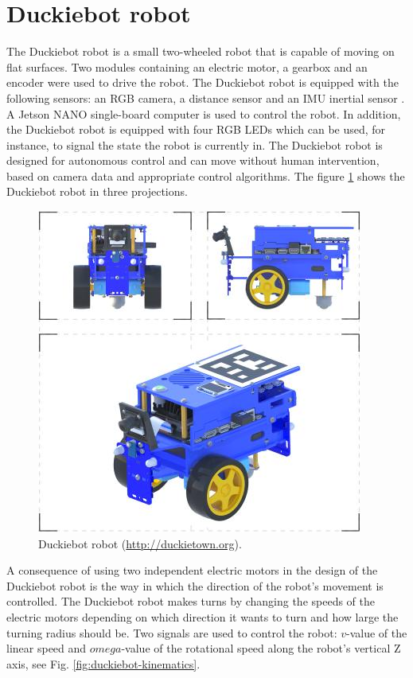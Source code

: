 \documentclass[conference]{IEEEtran}
\begin{document}

\section{Duckiebot robot}\label{sec:robot-duckiebot}
The Duckiebot robot is a small two-wheeled robot that is capable of moving on flat surfaces. Two modules containing an electric motor, a gearbox and an encoder were used to drive the robot. The Duckiebot robot is equipped with the following sensors: an RGB camera, a distance sensor and an IMU inertial sensor \cite{gupta2022low}. A Jetson NANO single-board computer is used to control the robot. In addition, the Duckiebot robot is equipped with four RGB LEDs which can be used, for instance, to signal the state the robot is currently in. The Duckiebot robot is designed for autonomous control and can move without human intervention, based on camera data and appropriate control algorithms. The figure \ref{fig:duckiebot-3d} shows the Duckiebot robot in three projections.

\begin{figure}[h]
    \centering
    \includegraphics[width=.9\columnwidth]{duckiebot-blue-3d}
    \caption{Duckiebot robot (\url{http://duckietown.org}).}
    \label{fig:duckiebot-3d}
\end{figure}

A consequence of using two independent electric motors in the design of the Duckiebot robot is the way in which the direction of the robot's movement is controlled.
The Duckiebot robot makes turns by changing the speeds of the electric motors depending on which direction it wants to turn and how large the turning radius should be.
Two signals are used to control the robot: $v$-value of the linear speed and $omega$-value of the rotational speed along the robot's vertical Z axis, see Fig. \ref{fig:duckiebot-kinematics}.
\end{document}
